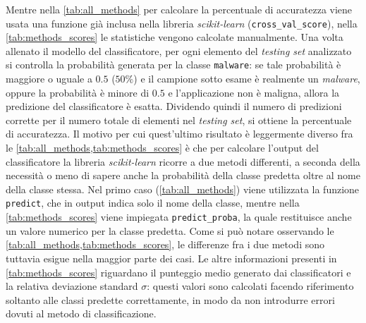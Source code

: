 \documentclass[12pt,a4paper,oneside]{article}
\begin{document}
Mentre nella \cref{tab:all_methods} per calcolare la percentuale di accuratezza viene usata una funzione già inclusa nella libreria \mbox{\textit{scikit-learn}} (\texttt{cross\_val\_score}), nella \cref{tab:methods_scores} le statistiche vengono calcolate manualmente. Una volta allenato il modello del classificatore, per ogni elemento del \textit{testing set} analizzato si controlla la probabilità generata per la classe \texttt{malware}: se tale probabilità è maggiore o uguale a $0.5$ ($50\%$) e il campione sotto esame è realmente un \textit{malware}, oppure la probabilità è minore di $0.5$ e l'applicazione non è maligna, allora la predizione del classificatore è esatta. Dividendo quindi il numero di predizioni corrette per il numero totale di elementi nel \textit{testing set}, si ottiene la percentuale di accuratezza. Il motivo per cui quest'ultimo risultato è leggermente diverso fra le \cref{tab:all_methods,tab:methods_scores} è che per calcolare l'output del classificatore la libreria \mbox{\textit{scikit-learn}} ricorre a due metodi differenti, a seconda della necessità o meno di sapere anche la probabilità della classe predetta oltre al nome della classe stessa. Nel primo caso (\cref{tab:all_methods}) viene utilizzata la funzione \texttt{predict}, che in output indica solo il nome della classe, mentre nella \cref{tab:methods_scores} viene impiegata \texttt{predict\_proba}, la quale restituisce anche un valore numerico per la classe predetta. Come si può notare osservando le \cref{tab:all_methods,tab:methods_scores}, le differenze fra i due metodi sono tuttavia esigue nella maggior parte dei casi. Le altre informazioni presenti in \cref{tab:methods_scores} riguardano il punteggio medio generato dai classificatori e la relativa deviazione standard $\sigma$: questi valori sono calcolati facendo riferimento soltanto alle classi predette correttamente, in modo da non introdurre errori dovuti al metodo di classificazione.
\end{document}
